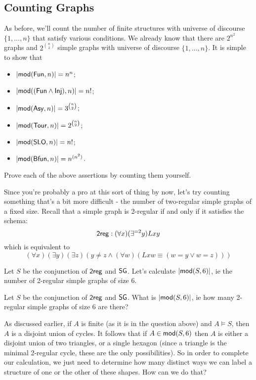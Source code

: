\subsection*{Counting Graphs}
As before, we'll count the number of finite structures with universe of discourse $\{1,\ldots,n\}$ that satisfy various conditions. We already know that there are $2^{n^2}$ graphs and $2^{\binom{n}{2}}$ simple graphs with universe of discourse $\{1,\ldots,n\}$. It is simple to show that
\begin{itemize}
\item
$\mbox{$|\mbox{$\mathsf {mod}(\mbox{$\mathsf{Fun}$},n)$}|$}= n^n$;
\item
$\mbox{$|\mbox{$\mathsf {mod}((\mbox{$\mathsf{Fun}$}\wedge\mbox{$\mathsf{Inj}$}),n)$}|$}= n!$;
\item
$\mbox{$|\mbox{$\mathsf {mod}(\mbox{$\mathsf{Asy}$},n)$}|$}= 3^{\binom{n}{2}}$;
\item
$\mbox{$|\mbox{$\mathsf {mod}(\mbox{$\mathsf{Tour}$},n)$}|$}= 2^{\binom{n}{2}}$;
\item
$\mbox{$|\mbox{$\mathsf {mod}(\mbox{$\mathsf{SLO}$},n)$}|$}= n!$;
\item
$\mbox{$|\mbox{$\mathsf {mod}(\mbox{$\mathsf{Bfun}$},n)$}|$}= n^{(n^2)}$.
\end{itemize}

\begin{aside}
    Prove each of the above assertions by counting them yourself. 
\end{aside}

Since you're probably a pro at this sort of thing by now, let's try counting something that's a bit more difficult - the number of two-regular simple graphs of a fixed size. Recall that a simple graph is 2-regular if and only if it satisfies the schema:
\[
    \mbox{$\mathsf{2reg}$}: (\forall x)(\exists^{=2}y)Lxy
\]
which is equivalent to 
\[
    (\forall x)(\exists y)(\exists z)(y\neq z\wedge(\forall w)(Lxw\equiv(w=y\vee w=z)))
\]

Let $S$ be the conjunction of $\mbox{$\mathsf{2reg}$}$ and $\mbox{$\mathsf{SG}$}$. Let's calculate $\mbox{$|\mbox{$\mathsf {mod}(S,6)$}|$}$, ie the number of 2-regular simple graphs of size 6. 

\begin{example}
Let $S$ be the conjunction of $\mbox{$\mathsf{2reg}$}$ and $\mbox{$\mathsf{SG}$}$. What is $\mbox{$|\mbox{$\mathsf {mod}(S,6)$}|$}$, ie how many 2-regular simple graphs of size 6 are there? 
\end{example}

As discussed earlier, if $A$ is finite (as it is in the question above) and $A \models S$, then $A$ is a disjoint union of cycles. It follows that if $A \in \mbox{$\mathsf {mod}(S,6)$}$ then $A$ is either a disjoint union of two triangles, or a single hexagon (since a triangle is the minimal 2-regular cycle, these are the only possibilities). So in order to complete our calculation, we just need to determine how many distinct ways we can label a structure of one or the other of these shapes. How can we do that?

